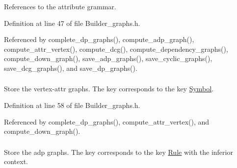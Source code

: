References to the attribute grammar. 



Definition at line 47 of file Builder\_\-graphs.h.

Referenced by complete\_\-dp\_\-graphs(), compute\_\-adp\_\-graph(), compute\_\-attr\_\-vertex(), compute\_\-dcg(), compute\_\-dependency\_\-graphs(), compute\_\-down\_\-graph(), save\_\-adp\_\-graphs(), save\_\-cyclic\_\-graphs(), save\_\-dcg\_\-graphs(), and save\_\-dp\_\-graphs().\hypertarget{classgenevalmag_1_1Builder__graphs_e5a3713f467704d2e3dc67da86ded862}{
\subsubsection[{attr\_\-vertex\_\-graphs}]{}}
\label{classgenevalmag_1_1Builder__graphs_e5a3713f467704d2e3dc67da86ded862}


Store the vertex-attr graphs. The key corresponds to the key \hyperlink{classgenevalmag_1_1Symbol}{Symbol}. 



Definition at line 58 of file Builder\_\-graphs.h.

Referenced by complete\_\-dp\_\-graphs(), compute\_\-attr\_\-vertex(), and compute\_\-down\_\-graph().\hypertarget{classgenevalmag_1_1Builder__graphs_75e37bb5a6f499fdd57f97061e313ec5}{
\subsubsection[{p\_\-Adp\_\-graphs}]{}}
\label{classgenevalmag_1_1Builder__graphs_75e37bb5a6f499fdd57f97061e313ec5}


Store the adp graphs. The key corresponds to the key \hyperlink{classgenevalmag_1_1Rule}{Rule} with the inferior context. 



